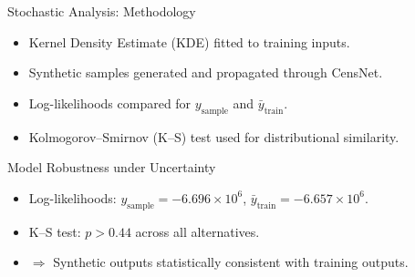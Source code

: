 \documentclass[hyperref={colorlinks,citecolor=blue,linkcolor=blue,urlcolor=blue}]{beamer}
\begin{document}


\begin{frame}{Stochastic Analysis: Methodology}
    \begin{itemize}
        \item Kernel Density Estimate (KDE) fitted to training inputs.
        \item Synthetic samples generated and propagated through CensNet.
        \item Log-likelihoods compared for $y_{\text{sample}}$ and $\bar{y}_{\text{train}}$.
        \item Kolmogorov–Smirnov (K–S) test used for distributional similarity.
    \end{itemize}
\end{frame}

\begin{frame}{Model Robustness under Uncertainty}
    \begin{itemize}
        \item Log-likelihoods: $y_{\text{sample}} = -6.696 \times 10^6$, 
              $\bar{y}_{\text{train}} = -6.657 \times 10^6$.
        \item K–S test: $p > 0.44$ across all alternatives.
        \item $\Rightarrow$ Synthetic outputs statistically consistent with training outputs.
    \end{itemize}
\end{frame}
\end{document}
